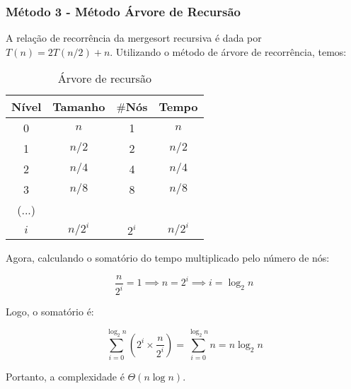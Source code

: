 \subsubsection{Método 3 - Método Árvore de Recursão}
A relação de recorrência da mergesort recursiva é dada por $T(n) = 2T(n/2) + n$. Utilizando o método de árvore de recorrência, temos:

\begin{table}[ht!]
    \centering
    \begin{tabular}{|c|c|c|c|}
    \hline
    \textbf{Nível} & \textbf{Tamanho} & $\#$\textbf{Nós} & \textbf{Tempo} \\ \hline
     0 & $n$ & 1 & $n$ \\ \hline
     1 & $n/2$ & 2 & $n/2$ \\ \hline
     2 & $n/4$ & 4 & $n/4$ \\ \hline
     3 & $n/8$ & 8 & $n/8$ \\ \hline
     (...) & & & \\ \hline
     $i$ & $n/2^i$ & $2^i$ & $n/2^i$ \\ \hline 
    \end{tabular}  
    \caption{Árvore de recursão}
\end{table}

Agora, calculando o somatório do tempo multiplicado pelo número de nós:

\[
\frac{n}{2^i} = 1 \implies n = 2^i \implies i = \log_2{n}
\]

Logo, o somatório é:

\[
\sum_{i=0}^{\log_2{n}} \left( 2^i \times \frac{n}{2^i} \right) = \sum_{i=0}^{\log_2{n}} n = n \log_2{n}
\]

Portanto, a complexidade é $\Theta(n \log n)$.
